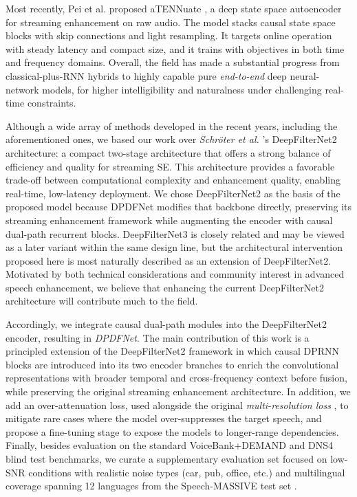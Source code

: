 \documentclass[final,5p,times,authoryear]{elsarticle}
\begin{document}
%
Most recently, Pei et al. proposed aTENNuate \citep{aTENNuate}, a deep state space autoencoder for streaming enhancement on raw audio. The model stacks causal state space blocks with skip connections and light resampling. It targets online operation with steady latency and compact size, and it trains with objectives in both time and frequency domains.
%
Overall, the field has made a substantial progress from classical-plus-RNN hybrids to highly capable pure \textit{end-to-end} deep neural-network models, for higher intelligibility and naturalness under challenging real-time constraints.

Although a wide array of methods developed in the recent years, including the aforementioned ones, we based our work over \emph{Schröter et al.} \citep{DeepFilterNet2}'s DeepFilterNet2 architecture: a compact two-stage architecture that offers a strong balance of efficiency and quality for streaming SE.
This architecture provides a favorable trade-off between computational complexity and enhancement quality, enabling real-time, low-latency deployment.
%
We chose DeepFilterNet2 as the basis of the proposed model because DPDFNet modifies that backbone directly, preserving its streaming enhancement framework while augmenting the encoder with causal dual-path recurrent blocks. DeepFilterNet3 \cite{DeepFilterNet3} is closely related and may be viewed as a later variant within the same design line, but the architectural intervention proposed here is most naturally described as an extension of DeepFilterNet2.
%
Motivated by both technical considerations and community interest in advanced speech enhancement, we believe that enhancing the current DeepFilterNet2 architecture will contribute much to the field.


Accordingly, we integrate causal dual-path modules into the DeepFilterNet2 encoder, resulting in \textit{DPDFNet}. The main contribution of this work is a principled extension of the DeepFilterNet2 framework in which causal DPRNN blocks are introduced into its two encoder branches to enrich the convolutional representations with broader temporal and cross-frequency context before fusion, while preserving the original streaming enhancement architecture. In addition, we add an over-attenuation loss, used alongside the original \textit{multi-resolution loss} \citep{DeepFilterNet2}, to mitigate rare cases where the model over-suppresses the target speech, and propose a fine-tuning stage to expose the models to longer-range dependencies. Finally, besides evaluation on the standard VoiceBank+DEMAND and DNS4 blind test benchmarks, we curate a supplementary evaluation set focused on low-SNR conditions with realistic noise types (car, pub, office, etc.) and multilingual coverage spanning 12 languages from the Speech-MASSIVE test set \citep{Speech-MASSIVE}.
\end{document}
